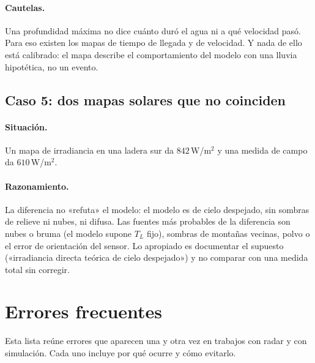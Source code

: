 \documentclass[11pt,a4paper]{article}
\begin{document}
\paragraph{Cautelas.} Una profundidad máxima no dice cuánto duró el agua ni a qué velocidad pasó. Para eso
existen los mapas de tiempo de llegada y de velocidad. Y nada de ello está calibrado: el mapa describe el
comportamiento del modelo con una lluvia hipotética, no un evento.

\subsection{Caso 5: dos mapas solares que no coinciden}

\paragraph{Situación.} Un mapa de irradiancia en una ladera sur da $842$\,W/m$^2$ y una medida de campo da
$610$\,W/m$^2$.

\paragraph{Razonamiento.} La diferencia no «refuta» el modelo: el modelo es de cielo despejado, sin sombras de
relieve ni nubes, ni difusa. Las fuentes más probables de la diferencia son nubes o bruma (el modelo supone $T_L$ fijo),
sombras de montañas vecinas, polvo o el error de orientación del sensor. Lo apropiado es documentar el
supuesto («irradiancia directa teórica de cielo despejado») y no comparar con una medida total sin
corregir.

\section{Errores frecuentes}
\label{sec:errores}

Esta lista reúne errores que aparecen una y otra vez en trabajos con radar y con simulación. Cada uno incluye
por qué ocurre y cómo evitarlo.
\end{document}
